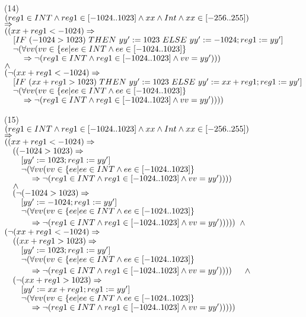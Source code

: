 \bigskip\noindent
(14)\\
$(reg1\in INT\et reg1\in[-1024..1023]\et xx\et Int\et xx\in[-256..255])$\\
$\fleche$\\
$(({xx+reg1} < -1024)\fleche$\\
$\tab{1em}[IF~ (-1024 > 1023) ~THEN~ yy' := 1023 ~ELSE~ yy' := -1024; reg1:=yy']$\\
$\tab{1em}\neg(\forall vv (vv\in \{ ee | ee\in INT \et ee\in [-1024..1023] \}$\\
$\tab{2em}\fleche\neg(reg1\in INT\et reg1\in[-1024..1023]\et vv = yy')))$\\
$\et$\\
$(\neg({xx+reg1} < -1024)\fleche$\\
$\tab{1em}[IF~ ( {xx+reg1} > 1023) ~THEN~ yy' := 1023 ~ELSE~ yy' := {xx+reg1}; reg1:=yy']$\\
$\tab{1em}\neg(\forall vv (vv\in \{ ee | ee\in INT \et ee\in [-1024..1023] \}$\\
$\tab{2em}\fleche\neg(reg1\in INT\et reg1\in[-1024..1023]\et vv = yy'))))$

\bigskip\noindent
(15)\\
$(reg1\in INT\et reg1\in[-1024..1023]\et xx\et Int\et xx\in[-256..255])$\\
$\fleche$\\
$(({xx+reg1} < -1024)\fleche$\\
$\tab{1em}((-1024 > 1023)\fleche$\\
$\tab{2em}[yy' := 1023; reg1:=yy']$\\
$\tab{2em}\neg(\forall vv (vv\in \{ ee | ee\in INT \et ee\in [-1024..1023] \}$\\
$\tab{3em}\fleche\neg(reg1\in INT\et reg1\in[-1024..1023]\et vv = yy'))))$\\
$\tab{1em}\et$\\
$\tab{1em}(\neg(-1024 > 1023)\fleche$\\
$\tab{2em}[yy' := -1024; reg1:=yy']$\\
$\tab{2em}\neg(\forall vv (vv\in \{ ee | ee\in INT \et ee\in [-1024..1023] \}$\\
$\tab{3em}\fleche\neg(reg1\in INT\et reg1\in[-1024..1023]\et vv = yy')))))$
$\et$\\
$(\neg({xx+reg1} < -1024)\fleche$\\
$\tab{1em}(({xx+reg1} > 1023)\fleche$\\
$\tab{2em}[yy' := 1023; reg1:=yy']$\\
$\tab{2em}\neg(\forall vv (vv\in \{ ee | ee\in INT \et ee\in [-1024..1023] \}$\\
$\tab{3em}\fleche\neg(reg1\in INT\et reg1\in[-1024..1023]\et vv = yy'))))$
$\tab{1em}\et$\\
$\tab{1em}(\neg( {xx+reg1} > 1023)\fleche$\\
$\tab{2em}[yy' := {xx+reg1}; reg1:=yy']$\\
$\tab{2em}\neg(\forall vv (vv\in \{ ee | ee\in INT \et ee\in [-1024..1023] \}$\\
$\tab{3em}\fleche\neg(reg1\in INT\et reg1\in[-1024..1023]\et vv = yy')))))$


